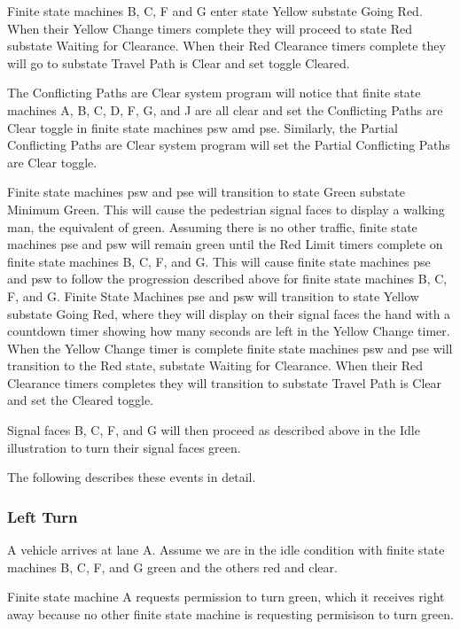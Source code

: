 \documentclass[letterpaper,twoside]{article}
\begin{document}
Finite state machines B, C, F and G enter state Yellow substate Going Red.
When their Yellow Change timers complete they will proceed to state Red
substate Waiting for Clearance.
When their Red Clearance timers complete they will go
to substate Travel Path is Clear and set toggle Cleared.

The Conflicting Paths are Clear system program will notice that
finite state machines A, B, C, D, F, G, and J are all clear and set the
Conflicting Paths are Clear toggle in finite state machines psw amd pse.
Similarly, the Partial Conflicting Paths are Clear system program will set the
Partial Conflicting Paths are Clear toggle.

Finite state machines  psw and pse will transition to state Green substate
Minimum Green.
This will cause the pedestrian signal faces to display a walking man,
the equivalent of green.
Assuming there is no other traffic, finite state machines
pse and psw will remain green until the Red Limit timers complete on
finite state machines B, C, F, and G.
This will cause finite state machines pse and psw to follow the progression
described above for finite state machines B, C, F, and G.
Finite State Machines pse and psw will transition to state Yellow
substate Going Red, where they will display on their signal faces
the hand with a countdown timer showing how many seconds are left
in the Yellow Change timer.  When the Yellow Change timer is complete
finite state machines psw and pse will transition to the
Red state, substate Waiting for Clearance.  When their Red Clearance timers
completes they will transition to substate Travel Path is Clear
and set the Cleared toggle.

Signal faces B, C, F, and G will then proceed as described above
in the Idle illustration to turn their signal faces green.

The following describes these events in detail.



\subsubsection{Left Turn}

A vehicle arrives at lane A.  Assume we are in the idle condition
with finite state machines B, C, F, and G green and the others red and clear.

Finite state machine A requests permission to turn green,
which it receives right away because no other finite state machine
is requesting permisison to turn green.
\end{document}
